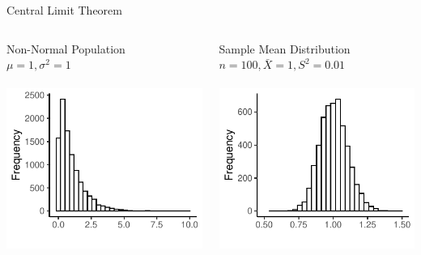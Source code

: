 \documentclass{./../div_teaching_slides}
\begin{document}
\begin{frame}{Central Limit Theorem}
\centering
\begin{columns}
\begin{column}{0.475\textwidth}
\centering
Non-Normal Population \\ $\mu=1, \sigma^2 = 1$ \\~\\
\includegraphics{./../../output/clt_exp_pop.pdf}
\end{column}
\begin{column}{0.475\textwidth}
\centering
Sample Mean Distribution \\ $n=100, \bar{X}=1, S^2 = 0.01$ \\~\\
\includegraphics{./../../output/clt_exp_samp_n100.pdf}
\end{column}
\end{columns}
\end{frame}
\end{document}
